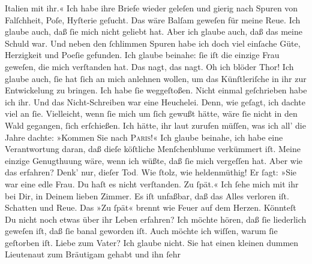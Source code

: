 \begin{ledgroupsized}[t]{13cm}
                  Italien mit ihr.«\pend
           \pstart
           Ich habe ihre Briefe wieder geleſen und gierig nach Spuren von Falſchheit, Poſe,
               Hyſterie geſucht. Das wäre Balſam geweſen für meine Reue. Ich glaube auch, daß ſie
               mich nicht geliebt hat. Aber ich glaube auch, daß das meine Schuld war. Und neben den
                  {\pb}ſchlimmen Spuren habe ich doch viel einſache
               Güte, Herzigkeit und Poeſie gefunden. Ich glaube beinahe: ſie iſt die einzige Frau
               geweſen, die mich \strikeout{\textcolor{gray}{ver}} verſtanden hat. Das nagt, das nagt. Oh ich blöder Thor!\pend
           \pstart
           Ich glaube auch, ſie hat ſich an mich anlehnen wollen, um das Künſtleriſche in ihr
               zur Entwickelung zu bringen. Ich habe ſie weggeſtoßen. Nicht einmal geſchrieben habe
               ich ihr. Und das Nicht-Schreiben war eine Heuchelei. Denn, wie geſagt, ich dachte
               viel an ſie. Vielleicht, wenn ſie mich um ſich gewußt hätte, wäre ſie nicht in den
               Wald {\pb}gegangen, ſich erſchießen. Ich hätte, ihr laut
               zurufen müſſen, was ich all’ die Jahre dachte: »Kommen Sie nach \textsc{Paris}!« Ich glaube beinahe, ich habe eine Verantwortung daran, daß dieſe köſtliche
                  Menſchenblume verkümmert
               iſt. Meine einzige Genugthuung wäre, wenn ich wüßte, daß ſie mich vergeſſen hat. Aber
               wie das erfahren?\pend
           \pstart
           Denk’ nur, dieſer Tod\textcolor{gray}{.} Wie ſtolz, wie heldenmüthig! Er ſagt: »Sie
               war eine edle Frau. Du haſt es nicht verſtanden. Zu ſpät.«\pend
           \pstart
           Ich ſehe mich mit ihr bei Dir, in Deinem lieben {\pb}Zimmer. Es iſt unfaßbar, daß das Alles verloren iſt. Schatten und Reue. Das »Zu
               ſpät« brennt wie Feuer auf dem Herzen.\pend
           \pstart
           Könnteſt Du nicht noch etwas über ihr Leben erfahren? Ich möchte hören, daß ſie liederlich geweſen iſt, daß
               ſie banal geworden iſt. Auch möchte ich wiſſen, \strikeout{\textcolor{gray}{×}} warum ſie geſtorben iſt. Liebe zum Vater? Ich glaube nicht. Sie hat einen kleinen dummen Lieutenaut zum Bräutigam gehabt und ihn ſehr

\end{ledgroupsized}
